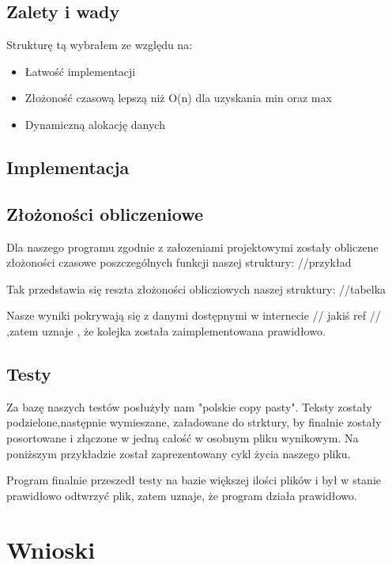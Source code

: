 \documentclass{article}
\begin{document}
\subsection{Zalety i wady}
Strukturę tą wybrałem ze względu na:
\begin{itemize}
    \item Łatwość implementacji
    \item Złożoność czasową lepszą niż O(n) dla uzyskania min oraz max
    \item Dynamiczną alokację danych
\end{itemize}


\subsection{Implementacja}
\subsection{Złożoności obliczeniowe}
Dla naszego programu zgodnie z załozeniami projektowymi zostały obliczene złożoności czasowe poszczególnych 
funkcji naszej struktury:
//przykład

Tak przedstawia się reszta złożoności oblicziowych naszej struktury:
//tabelka

Nasze wyniki pokrywają się z danymi dostępnymi w internecie // jakiś ref // ,zatem uznaje , że kolejka
została zaimplementowana prawidłowo.


\subsection{Testy}
Za bazę naszych testów posłużyły nam "polskie copy pasty". Teksty zostały podzielone,następnie wymieszane, załadowane do strktury,
by finalnie zostały posortowane i złączone w jedną całość w osobnym pliku wynikowym. Na poniższym przykładzie
został zaprezentowany cykl życia naszego pliku.



Program finalnie przeszedł testy na bazie większej ilości plików i był w stanie prawidłowo odtwrzyć plik, zatem
uznaje, że program działa prawidłowo.

\section{Wnioski}
\end{document}
